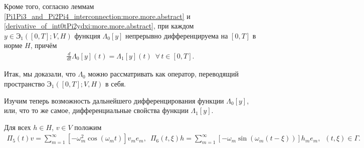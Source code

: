 \documentclass{report}
\begin{document}
Кроме того, согласно леммам \ref{Pi1Pi3_and_Pi2Pi4_interconnection:more.more.abstract} и \ref{derivative_of_int0tPi2ydxi:more.more.abstract}, при каждом $y\in{\textbf{Э}}_1([0,T];V,H)$
функция $\Lambda_0[y]$ непрерывно дифференцируема на $[0,T]$ в норме $H$, причём
\begin{gather*}
\frac{d}{dt}\Lambda_0[y](t)=\Lambda_1[y](t)\,\,\,\forall\,t\in[0,T].
\end{gather*}

Итак, мы доказали, что $\Lambda_0$ можно рассматривать как оператор, переводящий пространство ${\textbf{Э}}_1([0,T];V,H)$ в себя.

Изучим теперь возможность дальнейшего дифференцирования функции $\Lambda_0[y]$, или, что то же самое, дифференциальные свойства функции  $\Lambda_1[y]$.

Для всех $h\in H$, $v\in V$ положим
\begin{gather*}
\Pi_5(t)v=\sum\limits_{m=1}^\infty[-\omega_m^2\cos(\omega_mt)]v_me_m,\,\,\,\Pi_6(t,\xi)h=\sum\limits_{m=1}^\infty[-\omega_m\sin(\omega_m(t-\xi))]h_me_m,\,\,\,(t,\xi)\in\Gamma.
\end{gather*}
\end{document}
